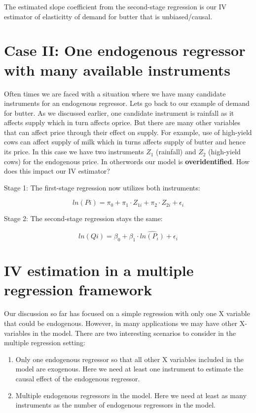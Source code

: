 \documentclass[
]{book}
\theoremstyle{definition}
\theoremstyle{definition}
\theoremstyle{definition}
\theoremstyle{definition}
\theoremstyle{remark}
\begin{document}
The estimated slope coefficient from the second-stage regression is our IV estimator of elasticitty of demand for butter that is unbiased/causal.

\hypertarget{case-ii-one-endogenous-regressor-with-many-available-instruments}{%
\section{Case II: One endogenous regressor with many available instruments}\label{case-ii-one-endogenous-regressor-with-many-available-instruments}}

Often times we are faced with a situation where we have many candidate instruments for an endogenous regressor. Lets go back to our example of demand for butter. As we discussed earlier, one candidate instrument is rainfall as it affects supply which in turn affects oprice. But there are many other variables that can affect price through their effect on supply. For example, use of high-yield cows can affect supply of milk which in turns affects supply of butter and hence its price. In this case we have two instruments \(Z_1\) (rainfall) and \(Z_2\) (high-yield cows) for the endogenous price. In otherwords our model is \textbf{overidentified}. How does this impact our IV estimator?

Stage 1: The first-stage regression now utilizes both instruments:

\[ln(Pi)=\pi_0+\pi_1\cdot Z_{1i}+\pi_2\cdot Z_{2i}+\epsilon_i\]

Stage 2: The second-stage regression stays the same:

\[ln(Qi)=\beta_0+\beta_1\cdot \widehat{ln(P_i)}+\epsilon_i\]

\hypertarget{iv-estimation-in-a-multiple-regression-framework}{%
\section{IV estimation in a multiple regression framework}\label{iv-estimation-in-a-multiple-regression-framework}}

Our discussion so far has focused on a simple regression with only one X variable that could be endogenous. However, in many applications we may have other X-variables in the model. There are two interesting scenarios to consider in the multiple regression setting:

\begin{enumerate}
\def\labelenumi{\arabic{enumi}.}
\item
  Only one endogenous regressor so that all other X variables included in the model are exogenous. Here we need at least one instrument to estimate the causal effect of the endogenous regressor.
\item
  Multiple endogenous regressors in the model. Here we need at least as many instruments as the number of endogenous regressors in the model.
\end{enumerate}
\end{document}
